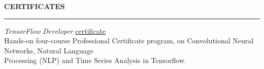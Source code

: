 \documentclass[10pt,letterpaper]{letter}
\newcommand{\gbullet}{\textcolor{gray}{\textbullet} }
\newcommand{\gsect}[1]{\textcolor{codepurple}{\textbf{{\Large \uppercase{#1} }}} \\ \hrule}
\begin{document}


\gsect{Certificates}
\textsl{TensorFlow Developer} \href{https://coursera.org/share/f65948fc03c3da5785b670010c27bbe4}{\textsf{certificate}}\\
\hspace*{10mm}  Hands-on four-course Professional Certificate program, on Convolutional Neural Networks, Natural Language \\ \hspace*{10mm} Processing (NLP) and Time Series Analysis in Tensorflow.
\end{document}
